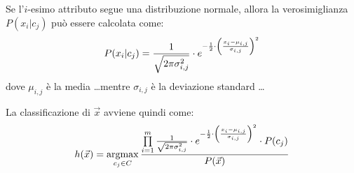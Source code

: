Se l'$i$-esimo attributo segue una distribuzione normale, allora la
verosimiglianza $P(x_i | c_j)$ può essere calcolata come:
\[
    P(x_i | c_j) = 
    \frac{1}{\sqrt{2 \pi \sigma_{i,j}^2}} \cdot e^{-\frac{1}{2} \cdot \left(\frac{x_i - \mu_{i,j}}{\sigma_{i,j}}\right)^2}
\]
dove $\mu_{i,j}$ è la media \ldots mentre $\sigma_{i,j}$ è
la deviazione standard \ldots

La classificazione di $\Vec{x}$ avviene quindi come:
\[
    h(\Vec{x}) = 
    \operatorname*{argmax}\limits_{c_j \in C} \frac{\prod\limits_{i=1}^m \frac{1}{\sqrt{2 \pi \sigma_{i,j}^2}} \cdot 
    e^{-\frac{1}{2} \cdot \left(\frac{x_i - \mu_{i,j}}{\sigma_{i,j}}\right)^2} \cdot P(c_j)}{P(\Vec{x})}
\]